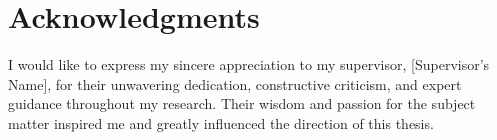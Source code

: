 \chapter*{Acknowledgments}
\label{Acknowledgments}
I would like to express my sincere appreciation to my supervisor, [Supervisor’s Name], for their unwavering dedication, constructive criticism, and expert guidance throughout my research. Their wisdom and passion for the subject matter inspired me and greatly influenced the direction of this thesis.